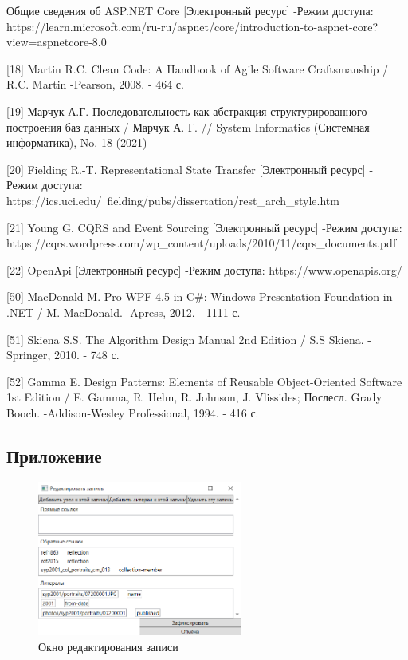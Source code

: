 \documentclass[12pt]{article}
\newcommand{\anonsection}[1]{\section*{#1}\addcontentsline{toc}{section}{#1}}
\begin{document}
\begin{flushleft}
    [17] Общие сведения об ASP.NET Core [Электронный ресурс] -Режим доступа: https://learn.microsoft.com/ru-ru/aspnet/core/introduction-to-aspnet-core?view=aspnetcore-8.0

    [18] Martin R.C. Clean Code: A Handbook of Agile Software Craftsmanship / R.C. Martin -Pearson, 2008. - 464 с.

    [19] Марчук А.Г. Последовательность как абстракция структурированного построения баз данных / Марчук А. Г. // System Informatics (Системная информатика), No. 18 (2021)

    [20] Fielding R.-T. Representational State Transfer [Электронный ресурс] - Режим доступа:  https://ics.uci.edu/~fielding/pubs/dissertation/rest\_arch\_style.htm

    [21] Young G. CQRS and Event Sourcing [Электронный ресурс] -Режим доступа: https://cqrs.wordpress.com/wp\_content/uploads/2010/11/cqrs\_documents.pdf

    [22] OpenApi [Электронный ресурс] -Режим доступа: https://www.openapis.org/

    [50] MacDonald M. Pro WPF 4.5 in C\#: Windows Presentation Foundation in .NET / M. MacDonald. -Apress, 2012. - 1111 с.

    [51] Skiena S.S. The Algorithm Design Manual 2nd Edition / S.S Skiena. -Springer, 2010. - 748 с.

    [52] Gamma E. Design Patterns: Elements of Reusable Object-Oriented Software 1st Edition / E. Gamma, R. Helm, R. Johnson, J. Vlissides; Послесл. Grady Booch. -Addison-Wesley Professional, 1994. - 416 с.

\end{flushleft}

\pagebreak

\begin{center}
    {\anonsection{Приложение}}
\end{center}

\begin{figure}[!ht]
    \centering
    \includegraphics[width=0.6\textwidth]{_images/edit_window.png}
    \caption*{Окно редактирования записи}
\end{figure}
\end{document}
